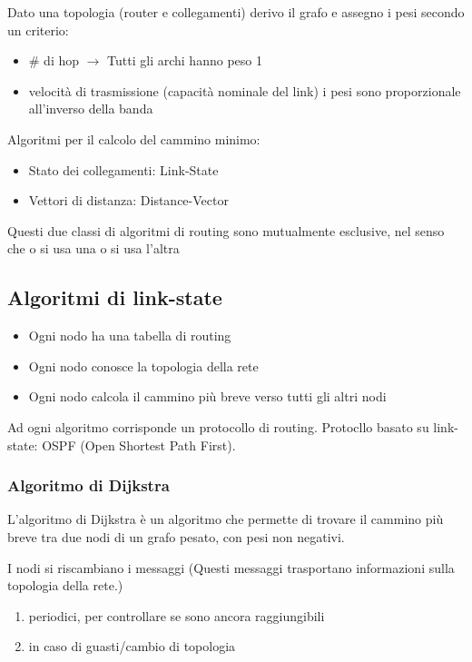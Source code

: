 \documentclass[a4paper]{article}
\begin{document}
\vspace{1em}
\noindent
Dato una topologia (router e collegamenti) derivo il grafo e assegno i pesi secondo un criterio:
\begin{itemize}
  \item \# di hop $\rightarrow$ Tutti gli archi hanno peso 1
  \item velocità di trasmissione (capacità nominale del link) i pesi sono proporzionale all'inverso della banda
\end{itemize}
Algoritmi per il calcolo del cammino minimo:
\begin{itemize}
  \item Stato dei collegamenti: Link-State
  \item Vettori di distanza: Distance-Vector
\end{itemize}
Questi due classi di algoritmi di routing sono mutualmente esclusive, nel senso che o si usa una o si usa l'altra


\subsection{Algoritmi di link-state}
\begin{itemize}
  \item Ogni nodo ha una tabella di routing
  \item Ogni nodo conosce la topologia della rete
  \item Ogni nodo calcola il cammino più breve verso tutti gli altri nodi
\end{itemize}
Ad ogni algoritmo corrisponde un protocollo di routing. Protocllo basato su link-state: OSPF (Open Shortest Path First). 
\subsubsection{Algoritmo di Dijkstra}

\begin{definition}
  L'algoritmo di Dijkstra è un algoritmo che permette di trovare il cammino più breve tra due nodi di un grafo pesato, con pesi non negativi.
\end{definition}
\noindent
I nodi si riscambiano i messaggi (Questi messaggi trasportano informazioni sulla topologia della rete.)
\begin{enumerate}
  \item periodici, per controllare se sono ancora raggiungibili
  \item in caso di guasti/cambio di topologia
\end{enumerate}
\end{document}
